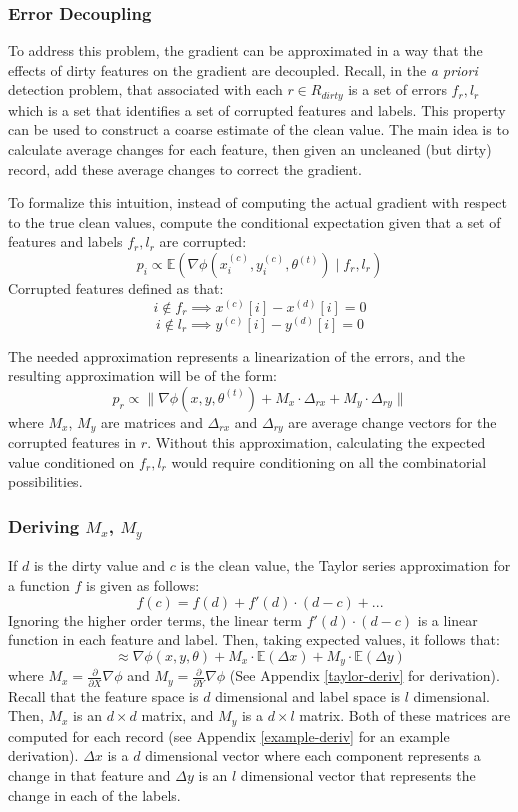 \subsubsection{Error Decoupling}
To address this problem, the gradient can be approximated in a way that the effects of dirty features on the gradient are decoupled.
Recall, in the \emph{a priori} detection problem, that associated with each $r \in R_{dirty}$ is a set of errors $f_r,l_r$ which is a set that identifies a set of corrupted features and labels.
This property can be used to construct a coarse estimate of the clean value.
The main idea is to calculate average changes for each feature, then given an uncleaned (but dirty) record, add these average changes to correct the gradient.

To formalize this intuition, instead of computing the actual gradient with respect to the 
true clean values, compute the conditional expectation given that a set of features and labels $f_r,l_r$ are corrupted:
\[
p_i \propto \mathbb{E}(\nabla\phi(x^{(c)}_i,y^{(c)}_i,\theta^{(t)}) \mid f_r,l_r)
\]
Corrupted features defined as that:
\[
i \notin f_r \implies x^{(c)}[i] - x^{(d)}[i] = 0
\]
\[
i \notin l_r \implies y^{(c)}[i] - y^{(d)}[i] = 0
\]

The needed approximation represents a linearization of the errors, and the resulting approximation will be of the form:
\[
p_{r}\propto\|\nabla\phi(x,y,\theta^{(t)}) + M_x \cdot \Delta_{rx} +  M_y \cdot \Delta_{ry}\|
\]
where $M_x$, $M_y$ are matrices and $\Delta_{rx}$ and $\Delta_{ry}$ are average change vectors for the corrupted features in $r$. 
Without this approximation, calculating the expected value conditioned on $f_r,l_r$ would require conditioning on all the combinatorial possibilities.

\subsubsection{Deriving $M_x$, $M_y$}
If $d$ is the dirty value and $c$ is the clean value, the Taylor series approximation for a function $f$ is given as follows:
\[
f(c) = f(d) + f'(d)\cdot(d-c) + ...
\]
Ignoring the higher order terms, the linear term $f'(d)\cdot(d-c)$ is a linear function in each feature and label.
Then, taking expected values, it follows that:
\[
\approx \nabla\phi(x,y,\theta) + M_x \cdot \mathbb{E}(\Delta x) + M_y \cdot \mathbb{E}(\Delta y)
\]
where $M_x = \frac{\partial}{\partial X}\nabla\phi$ and $M_y = \frac{\partial}{\partial Y}\nabla\phi$ (See Appendix \ref{taylor-deriv} for derivation).
Recall that the feature space is $d$ dimensional and label space is $l$ dimensional.
Then, $M_x$ is an $d \times d$ matrix, and $M_y$ is a $d \times l$ matrix.
Both of these matrices are computed for each record (see Appendix \ref{example-deriv} for an example derivation).
$\Delta x$ is a $d$ dimensional vector where each component represents a change in that feature and $\Delta y$ is an $l$ dimensional vector that represents the change in each of the labels. 

